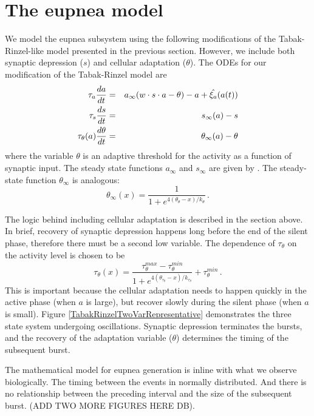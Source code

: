 \documentclass[12pt]{article}
\def\w{w}
\def\taus{\tau_s}
\def\ainf{a_\infty}
\def\sinf{s_\infty}
\def\thetainf{\theta_\infty}
\def\tautheta{\tau_\theta}
\def\tauthetamax{\tau_\theta^{max}}
\def\tauthetamin{\tau_\theta^{min}}
\def\thetatheta{\theta_\theta}
\def\ktheta{k_\theta}
\def\thetatautheta{\theta_{\tautheta}}
\def\ktautheta{k_{\tautheta}}
\def\xia{\xi_a}
\begin{document}
\clearpage
\section*{The eupnea model}

We model the eupnea subsystem using the following modifications of the Tabak-Rinzel-like model presented in the previous section. However, 
we include both synaptic depression ($s$) and 
cellular adaptation ($\theta$). 
The ODEs for our modification of the Tabak-Rinzel model are
\begin{eqnarray}
\tau_a \ddt{a} &=& \ainf (\w \cdot s \cdot a - \theta) - a + \hat{\xia}(a(t)) \label{ODEA} \\
\taus \ddt{s} &=& \sinf (a) - s  \label{ODES} \\
\tautheta(a) \ddt{\theta} &=& \thetainf (a) - \theta   \label{ODETHETA} 
\end{eqnarray}
where the variable  $\theta$ is an adaptive threshold for the activity as a function of synaptic input. 
The steady state functions $\ainf$ and $\sinf$ are given by .  The steady-state function $\thetainf$ is analogous:
\begin{equation}
\thetainf(x) = \frac{1}{1+e^{4(\thetatheta-x)/\ktheta}} \label{SQUASHTHETA} \, . 
\end{equation}

The logic behind including cellular adaptation is described in the section above. In brief, recovery of synaptic depression happens long before the end of the silent phase, therefore there must be a second low variable.
The dependence of $\tautheta$ on the activity level is chosen to be 
\begin{equation}
    \tautheta(x) = \frac{\tauthetamax - \tauthetamin}{1+e^{4(\thetatautheta-x)/\ktautheta}}  + \tauthetamin \, . 
\end{equation}
This is important because the cellular adaptation needs to happen quickly in the active phase (when $a$ is large), but recover slowly during the silent phase (when $a$ is small). Figure \ref{TabakRinzelTwoVarRepresentative} demonstrates the three state system undergoing oscillations. Synaptic depression terminates the bursts, and the recovery of the adaptation variable ($\theta$) determines the timing of the subsequent burst. 

The mathematical model for eupnea generation is inline with what we observe biologically. The timing between the events in normally distributed. And there is no relationship between the preceding interval and the size of the subsequent burst. (ADD TWO MORE FIGURES HERE DB).
\end{document}
